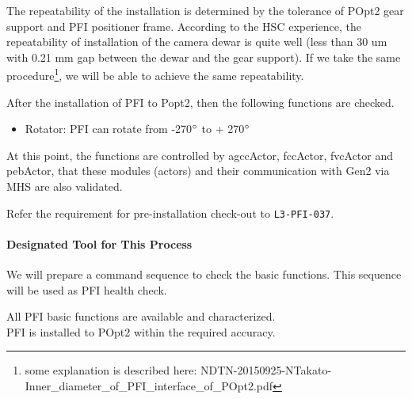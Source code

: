 The repeatability of the installation is determined by the tolerance of POpt2 gear support and PFI positioner frame.
According to the HSC experience, the repeatability of installation of the camera dewar is quite well (less than 30 um with 0.21 mm gap between the dewar and the gear support).
If we take the same procedure\footnote{some explanation is described here: NDTN-20150925-NTakato-Inner\_diameter\_of\_PFI\_interface\_of\_POpt2.pdf}, we will be able to achieve the same repeatability.

After the installation of PFI to Popt2, then the following functions are checked.
\begin{itemize}
\item Rotator: PFI can rotate from -270$^\circ$ to + 270$^\circ$
\end{itemize}

At this point, the functions are controlled by agccActor, fccActor, fvcActor and pebActor, that these modules (actors) and their communication with Gen2 via MHS are also validated.

Refer the requirement for pre-installation check-out to {\tt L3-PFI-037}.

\paragraph{Designated Tool for This Process} 
We will prepare a command sequence to check the basic functions.
This sequence will be used as PFI health check.

\begin{itembox}[l]{}
All PFI basic functions are available and characterized.\\
PFI is installed to POpt2 within the required accuracy. 

\end{itembox}
